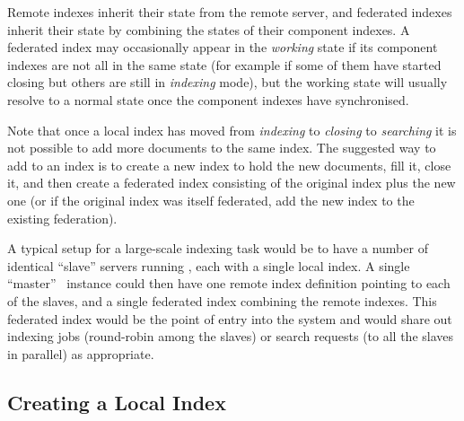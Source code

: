 Remote indexes inherit their state from the remote server, and federated
indexes inherit their state by combining the states of their component indexes.
A federated index may occasionally appear in the {\em working} state if its
component indexes are not all in the same state (for example if some of them
have started closing but others are still in {\em indexing} mode), but the
working state will usually resolve to a normal state once the component indexes
have synchronised.

Note that once a local index has moved from {\em indexing} to {\em closing} to
{\em searching} it is not possible to add more documents to the same index.
The suggested way to add to an index is to create a new index to hold the new
documents, fill it, close it, and then create a federated index consisting of
the original index plus the new one (or if the original index was itself
federated, add the new index to the existing federation).

A typical setup for a large-scale indexing task would be to have a number of
identical ``slave'' servers running \Mimir, each with a single local index.  A
single ``master'' \Mimir\ instance could then have one remote index definition
pointing to each of the slaves, and a single federated index combining the
remote indexes.  This federated index would be the point of entry into the
system and would share out indexing jobs (round-robin among the slaves) or
search requests (to all the slaves in parallel) as appropriate.

\subsection{Creating a Local Index}

